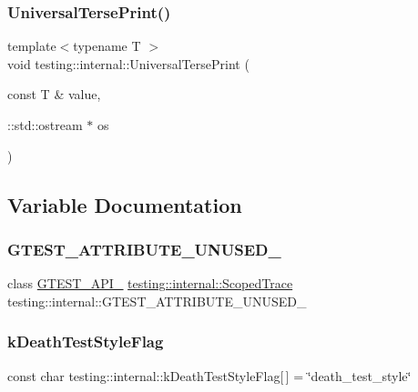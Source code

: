 \subsubsection{\texorpdfstring{UniversalTersePrint()}{UniversalTersePrint()}}
{\footnotesize\ttfamily template$<$typename T $>$ \\
void testing\+::internal\+::\+Universal\+Terse\+Print (\begin{DoxyParamCaption}\item[{const T \&}]{value,  }\item[{\+::std\+::ostream $\ast$}]{os }\end{DoxyParamCaption})}



\subsection{Variable Documentation}
\mbox{\label{namespacetesting_1_1internal_a09251adf471f681a1bc1ab0d53fb70cf}} 
\subsubsection{\texorpdfstring{GTEST\_ATTRIBUTE\_UNUSED\_}{GTEST\_ATTRIBUTE\_UNUSED\_}}
{\footnotesize\ttfamily class \mbox{\hyperlink{gtest-port_8h_aa73be6f0ba4a7456180a94904ce17790}{G\+T\+E\+S\+T\+\_\+\+A\+P\+I\+\_\+}} \mbox{\hyperlink{classtesting_1_1internal_1_1_scoped_trace}{testing\+::internal\+::\+Scoped\+Trace}}  testing\+::internal\+::\+G\+T\+E\+S\+T\+\_\+\+A\+T\+T\+R\+I\+B\+U\+T\+E\+\_\+\+U\+N\+U\+S\+E\+D\+\_\+}

\mbox{\label{namespacetesting_1_1internal_a008ebfe0c0347d65e5e06e4d310981b3}} 
\subsubsection{\texorpdfstring{kDeathTestStyleFlag}{kDeathTestStyleFlag}}
{\footnotesize\ttfamily const char testing\+::internal\+::k\+Death\+Test\+Style\+Flag\mbox{[}$\,$\mbox{]} = \char`\"{}death\+\_\+test\+\_\+style\char`\"{}}

